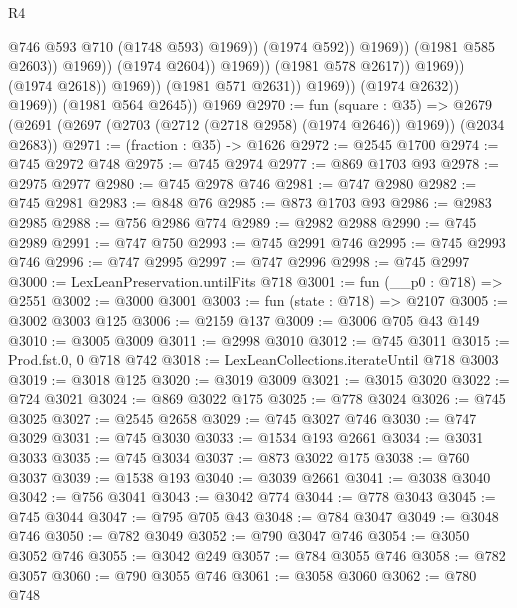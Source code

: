 \begin{lexlean}{R4}
\begin{coremodule}
                                                    @746
                                                    @593
                                                    @710
                                                    (@1748 @593)
                                                    @1969))
                                                (@1974 @592))
                                              @1969))
                                          (@1981 @585 @2603))
                                        @1969))
                                    (@1974 @2604))
                                  @1969))
                              (@1981 @578 @2617))
                            @1969))
                        (@1974 @2618))
                      @1969))
                  (@1981 @571 @2631))
                @1969))
            (@1974 @2632))
          @1969))
      (@1981 @564 @2645))
    @1969
@2970 := fun (square : @35) =>
  @2679 (@2691 (@2697 (@2703 (@2712 (@2718 @2958) (@1974 @2646)) @1969)) (@2034 @2683))
@2971 := (fraction : @35) -> @1626
@2972 := @2545 @1700
@2974 := @745 @2972 @748
@2975 := @745 @2974
@2977 := @869 @1703 @93
@2978 := @2975 @2977
@2980 := @745 @2978 @746
@2981 := @747 @2980
@2982 := @745 @2981
@2983 := @848 @76
@2985 := @873 @1703 @93
@2986 := @2983 @2985
@2988 := @756 @2986 @774
@2989 := @2982 @2988
@2990 := @745 @2989
@2991 := @747 @750
@2993 := @745 @2991 @746
@2995 := @745 @2993 @746
@2996 := @747 @2995
@2997 := @747 @2996
@2998 := @745 @2997
@3000 := LexLeanPreservation.untilFits @718
@3001 := fun (__p0 : @718) => @2551
@3002 := @3000 @3001
@3003 := fun (state : @718) => @2107
@3005 := @3002 @3003 @125
@3006 := @2159 @137
@3009 := @3006 @705 @43 @149
@3010 := @3005 @3009
@3011 := @2998 @3010
@3012 := @745 @3011
@3015 := Prod.fst.{0, 0} @718 @742
@3018 := LexLeanCollections.iterateUntil @718 @3003
@3019 := @3018 @125
@3020 := @3019 @3009
@3021 := @3015 @3020
@3022 := @724 @3021
@3024 := @869 @3022 @175
@3025 := @778 @3024
@3026 := @745 @3025
@3027 := @2545 @2658
@3029 := @745 @3027 @746
@3030 := @747 @3029
@3031 := @745 @3030
@3033 := @1534 @193 @2661
@3034 := @3031 @3033
@3035 := @745 @3034
@3037 := @873 @3022 @175
@3038 := @760 @3037
@3039 := @1538 @193
@3040 := @3039 @2661
@3041 := @3038 @3040
@3042 := @756 @3041
@3043 := @3042 @774
@3044 := @778 @3043
@3045 := @745 @3044
@3047 := @795 @705 @43
@3048 := @784 @3047
@3049 := @3048 @746
@3050 := @782 @3049
@3052 := @790 @3047 @746
@3054 := @3050 @3052 @746
@3055 := @3042 @249
@3057 := @784 @3055 @746
@3058 := @782 @3057
@3060 := @790 @3055 @746
@3061 := @3058 @3060
@3062 := @780 @748

\end{coremodule}
\end{lexlean}
